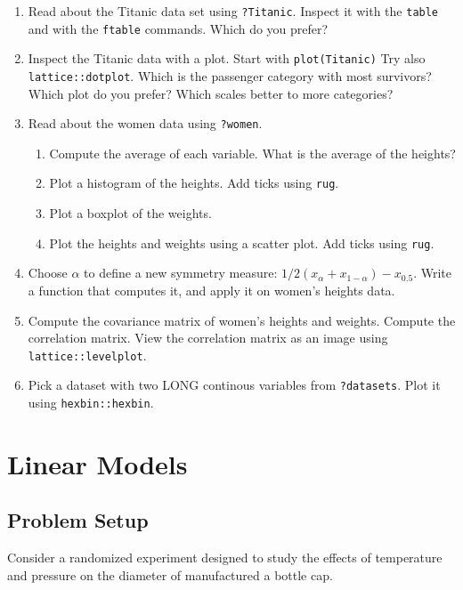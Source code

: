 \documentclass[]{book}
\providecommand{\tightlist}{%
  \setlength{\itemsep}{0pt}\setlength{\parskip}{0pt}}
\theoremstyle{definition}
\theoremstyle{definition}
\theoremstyle{definition}
\theoremstyle{remark}
\let\BeginKnitrBlock\begin \let\EndKnitrBlock\end
\begin{document}
\begin{enumerate}
\def\labelenumi{\arabic{enumi}.}
\item
  Read about the Titanic data set using \texttt{?Titanic}. Inspect it with the \texttt{table} and with the \texttt{ftable} commands. Which do you prefer?
\item
  Inspect the Titanic data with a plot. Start with \texttt{plot(Titanic)} Try also \texttt{lattice::dotplot}. Which is the passenger category with most survivors? Which plot do you prefer? Which scales better to more categories?
\item
  Read about the women data using \texttt{?women}.

  \begin{enumerate}
  \def\labelenumii{\arabic{enumii}.}
  \tightlist
  \item
    Compute the average of each variable. What is the average of the heights?
  \item
    Plot a histogram of the heights. Add ticks using \texttt{rug}.
  \item
    Plot a boxplot of the weights.
  \item
    Plot the heights and weights using a scatter plot. Add ticks using \texttt{rug}.
  \end{enumerate}
\item
  Choose \(\alpha\) to define a new symmetry measure: \(1/2(x_\alpha+x_{1-\alpha})-x_{0.5}\).
  Write a function that computes it, and apply it on women's heights data.
\item
  Compute the covariance matrix of women's heights and weights. Compute the correlation matrix. View the correlation matrix as an image using \texttt{lattice::levelplot}.
\item
  Pick a dataset with two LONG continous variables from \texttt{?datasets}. Plot it using \texttt{hexbin::hexbin}.
\end{enumerate}

\hypertarget{lm}{%
\chapter{Linear Models}\label{lm}}

\hypertarget{problem-setup}{%
\section{Problem Setup}\label{problem-setup}}

\BeginKnitrBlock{example}[Bottle Cap Production]
\protect\hypertarget{exm:cap-experiment}{}{\label{exm:cap-experiment} {} }Consider a randomized experiment designed to study the effects of temperature and pressure on the diameter of manufactured a bottle cap.
\EndKnitrBlock{example}
\end{document}
